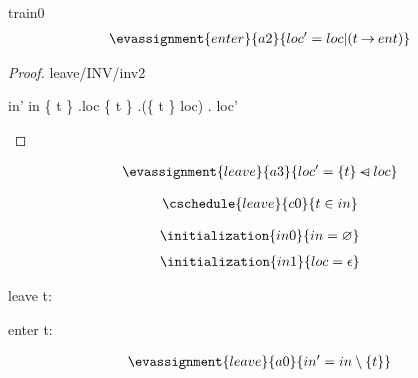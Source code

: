 \documentclass[12pt]{amsart}
\begin{document}
\begin{machine}{train0}
\begin{align*}
\evassignment{enter}{a2}
{	loc' = loc | (t \tfun ent)	}
\end{align*}

\begin{proof}{leave/INV/inv2}
	\begin{calculation}
		in'
	\hint{=}{ \ref{a0} }
		in \setminus \{ t \}
	\hint{=}{ \ref{inv2} }
		\dom.loc \setminus \{ t \}
		\dom.(\{ t \} \domsub loc)
	\hint{=}{ \ref{a3} } 
		\dom. loc' 
	\end{calculation}
\end{proof}

\begin{align*}
\evassignment{leave}{a3}
{	loc' = \{ t \} \domsub loc 	}
\end{align*}

\begin{align*}
\cschedule{leave}{c0}
{	t \in in	}
\end{align*}

\begin{align*}
\initialization{in0}
{	in = \emptyset 	}
\end{align*}
\begin{align*}
\initialization{in1}
{	loc = \emptyfun	}
\end{align*}

\begin{use:set}{\TRAIN} \end{use:set}
\begin{use:set}{\LOC} \end{use:set}
\begin{use:set}{\BLK} \end{use:set}
\begin{use:fun}{\TRAIN}{\BLK} \end{use:fun}

\begin{indices}{leave}
	t: \TRAIN
\end{indices}

\begin{indices}{enter}
	t: \TRAIN
\end{indices}

\begin{align*}
\evassignment{leave}{a0}
{	in' = in \setminus \{ t \}	}
\end{align*}


\end{machine}
\end{document}
